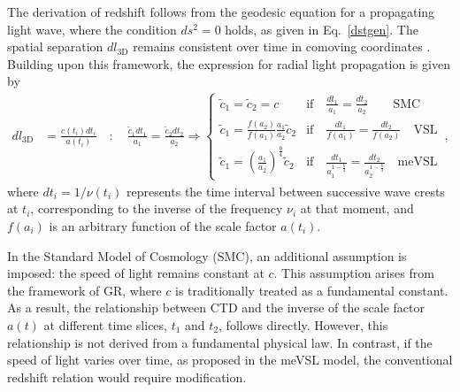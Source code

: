 \documentclass[jkps,preprint,fleqn]{revtex4} %
\newcommand{\tc}{\tilde{c}}
\begin{document}
The derivation of redshift follows from the geodesic equation for a propagating light wave, where the condition $ds^2 = 0$ holds, as given in Eq.~\eqref{dstgen}. The spatial separation $dl_{3\textrm{D}}$ remains consistent over time in comoving coordinates  \cite{Lee:2024mal,Lee:2024zcu}. Building upon this framework, the expression for radial light propagation is given by
\begin{align}
d l_{3\textrm{D}} &= \frac{c(t_i) dt_i}{a(t_i)} \quad : \quad \frac{\tc_1 dt_1}{a_1} = \frac{\tc_2 dt_2}{a_2} \Rightarrow \begin{cases} \tc_1 = \tc_2 = c & \textrm{if} \quad \frac{dt_1}{a_1} = \frac{dt_2}{a_2} \qquad \textrm{SMC} \\ 
\tc_1 = \frac{f(a_2)}{f(a_1)} \frac{a_1}{a_2} \tc_2 & \textrm{if} \quad \frac{dt_1}{f(a_1)} = \frac{dt_2}{f(a_2)} \quad \textrm{VSL} \\ \tc_1 = \left( \frac{a_1}{a_2}\right)^{\frac{b}{4}} \tc_2 & \textrm{if} \quad \frac{dt_1}{a_1^{1-\frac{b}{4}}} = \frac{dt_2}{a_2^{1-\frac{b}{4}}} \quad \textrm{meVSL}  \end{cases} \,, \label{dl3D}
\end{align}
where $dt_i = 1/\nu(t_i)$ represents the time interval between successive wave crests at $t_i$, corresponding to the inverse of the frequency $\nu_i$ at that moment, and $f(a_i)$ is an arbitrary function of the scale factor $a(t_i)$.

In the Standard Model of Cosmology (SMC), an additional assumption is imposed: the speed of light remains constant at $c$. This assumption arises from the framework of GR, where $c$ is traditionally treated as a fundamental constant. As a result, the relationship between CTD and the inverse of the scale factor $a(t)$ at different time slices, $t_1$ and $t_2$, follows directly. However, this relationship is not derived from a fundamental physical law. In contrast, if the speed of light varies over time, as proposed in the meVSL model, the conventional redshift relation would require modification.
\end{document}
